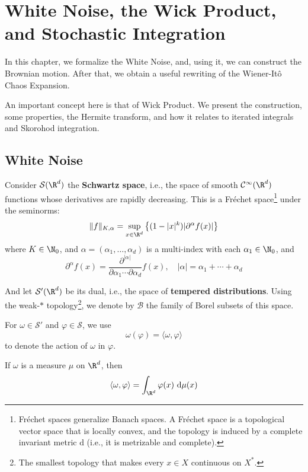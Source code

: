 \chapter{White Noise, the Wick Product, and Stochastic Integration}

In this chapter, we formalize the White Noise, and, using it, we can construct the Brownian motion. After that, we obtain a useful rewriting of the Wiener-Itô Chaos Expansion.

An important concept here is that of Wick Product. We present the construction, some properties, the Hermite transform, and how it relates to iterated integrals and Skorohod integration.

\section{White Noise}

Consider $\mathcal{S}(\R^d)$ the \textbf{Schwartz space}, i.e., the space of smooth $\mathcal{C}^\infty(\R^d)$ functions whose derivatives are rapidly decreasing. This is a Fréchet space\footnote{Fréchet spaces generalize Banach spaces. A Fréchet space is a topological vector space that is locally convex, and the topology is induced by a complete invariant metric $\mathrm{d}$ (i.e., it is metrizable and complete).} under the seminorms:
\[
  \| f \|_{K, \alpha} = \sup_{x \in \R^d} \left\{ (1 - |x|^k)|\partial^\alpha f(x)| \right\}
\]
where $K \in \N_0$, and $\alpha = (\alpha_1, \ldots, \alpha_d)$ is a multi-index with each $\alpha_ 1 \in \N_0$, and 
\[
  \partial^\alpha f(x) = \frac{\partial^{|\alpha|}}{\partial \alpha_1 \cdots \partial \alpha_d} f(x), \quad |\alpha| = \alpha_1 + \cdots + \alpha_d
\]

And let $\mathcal{S}'(\R^d)$ be its dual, i.e., the space of \textbf{tempered distributions}. Using the weak-$\ast$ topology\footnote{The smallest topology that makes every $x \in X$ continuous on $X^\ast$.}, we denote by $\mathcal{B}$ the family of Borel subsets of this space. 

For $\omega \in \mathcal{S}'$ and $\varphi \in \mathcal{S}$, we use
\[
\omega(\varphi) = \langle \omega, \varphi \rangle
\]
to denote the action of $\omega$ in $\varphi$.

\begin{example}
If $\omega$ is a measure $\mu$ on $\R^d$, then 
\[
\langle \omega, \varphi \rangle = \int_{\R^d} \varphi(x) ~\mathrm{d}\mu(x)
\]
\end{example}

